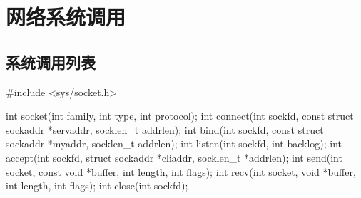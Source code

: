 \documentclass[UTF8]{beamer}
\begin{document}
\section{网络系统调用}
\subsection{系统调用列表}
\begin{frame}[fragile]
  \begin{ccode}
    #include <sys/socket.h>

    int socket(int family, int type, int protocol);
    int connect(int sockfd, const struct sockaddr *servaddr, socklen_t addrlen);
    int bind(int sockfd, const struct sockaddr *myaddr, socklen_t addrlen);
    int listen(int sockfd, int backlog);
    int accept(int sockfd, struct sockaddr *cliaddr, socklen_t *addrlen);
    int send(int socket, const void *buffer, int length, int flags);
    int recv(int socket, void *buffer, int length, int flags);
    int close(int sockfd);
  \end{ccode}
\end{frame}
\end{document}
